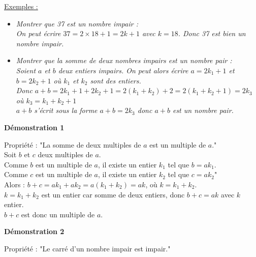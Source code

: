 \documentclass[a4paper,12pt]{article}
\newcommand{\bi}{\begin{itemize}}
\newcommand{\ei}{\end{itemize}}
\begin{document}
\underline{Exemples :}
\bi
\item \textit{Montrer que 37 est un nombre impair :\\
 On peut écrire $37 = 2 \times 18 + 1 = 2k+1$ avec $k=18$. Donc 37 est bien un nombre impair.}\\
 
\item \textit{Montrer que la somme de deux nombres impairs est un nombre pair :\\
 Soient $a$ et $b$ deux entiers impairs. On peut alors écrire $a=2k_{1}+1$ et $b=2k_{2}+1$  où $k_{1}$ et $k_{2}$ sont des entiers.\\
 Donc $a+b= 2k_{1}+1 + 2k_{2}+1 = 2(k_{1} + k_{2})+2=2(k_{1} + k_{2}+1)=2k_{3}$ où $k_{3}=k_{1}+k_{2}+1$\\
$a+b$ s'écrit sous la forme $a+b=2k_{3}$ donc $a+b$ est un nombre pair.\\
}
\ei
\vspace*{0.5cm}



\newpage

\vspace*{1cm}
\begin{large}
\textbf{Démonstration 1}\\
\end{large}
Propriété : "La somme de deux multiples de $a$ est un multiple de $a$."\\

Soit $b$ et $c$ deux multiples de $a$.\\
Comme $b$ est un multiple de $a$, il existe un entier $k_{1}$ tel que  $b=ak_{1}$.\\
Comme $c$ est un multiple de $a$, il existe un entier $k_{2}$ tel que $c=ak_{2}$"\\
Alors : $b+c = ak_{1} + ak_{2} = a(k_{1} + k_{2}) =ak$, où $k = k_{1} + k_{2}$.\\
$k = k_{1} + k_{2}$ est un entier car somme de deux entiers, donc $b+c =ak$ avec $k$ entier.\\
$b+c$ est donc un multiple de $a$.\\

\vspace*{1.5cm}


\begin{large}
\textbf{Démonstration 2}\\
\end{large}
Propriété : "Le carré d'un nombre impair est impair."\\
\end{document}
